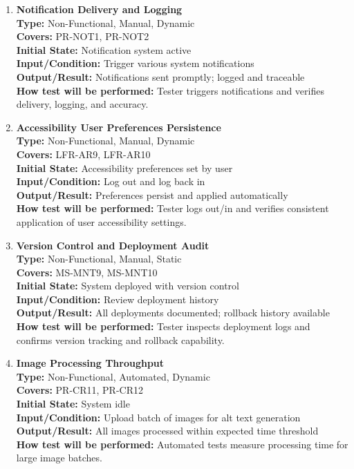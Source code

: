 \documentclass[12pt, titlepage]{article}
\begin{document}
\begin{enumerate}[label=NFR-ST \arabic*., wide=0pt, leftmargin=*]
  \item \textbf{Notification Delivery and Logging} \\[2mm]
    \textbf{Type:} Non-Functional, Manual, Dynamic \\
    \textbf{Covers:} PR-NOT1, PR-NOT2 \\
    \textbf{Initial State:} Notification system active \\
    \textbf{Input/Condition:} Trigger various system notifications \\
    \textbf{Output/Result:} Notifications sent promptly; logged and
    traceable \\[2mm]
    \textbf{How test will be performed:} Tester triggers
    notifications and verifies delivery, logging, and accuracy.

  \item \textbf{Accessibility User Preferences Persistence} \\[2mm]
    \textbf{Type:} Non-Functional, Manual, Dynamic \\
    \textbf{Covers:} LFR-AR9, LFR-AR10 \\
    \textbf{Initial State:} Accessibility preferences set by user \\
    \textbf{Input/Condition:} Log out and log back in \\
    \textbf{Output/Result:} Preferences persist and applied
    automatically \\[2mm]
    \textbf{How test will be performed:} Tester logs out/in and
    verifies consistent application of user accessibility settings.

  \item \textbf{Version Control and Deployment Audit} \\[2mm]
    \textbf{Type:} Non-Functional, Manual, Static \\
    \textbf{Covers:} MS-MNT9, MS-MNT10 \\
    \textbf{Initial State:} System deployed with version control \\
    \textbf{Input/Condition:} Review deployment history \\
    \textbf{Output/Result:} All deployments documented; rollback
    history available \\[2mm]
    \textbf{How test will be performed:} Tester inspects deployment
    logs and confirms version tracking and rollback capability.

  \item \textbf{Image Processing Throughput} \\[2mm]
    \textbf{Type:} Non-Functional, Automated, Dynamic \\
    \textbf{Covers:} PR-CR11, PR-CR12 \\
    \textbf{Initial State:} System idle \\
    \textbf{Input/Condition:} Upload batch of images for alt text generation \\
    \textbf{Output/Result:} All images processed within expected time
    threshold \\[2mm]
    \textbf{How test will be performed:} Automated tests measure
    processing time for large image batches.


\end{enumerate}
\end{document}
